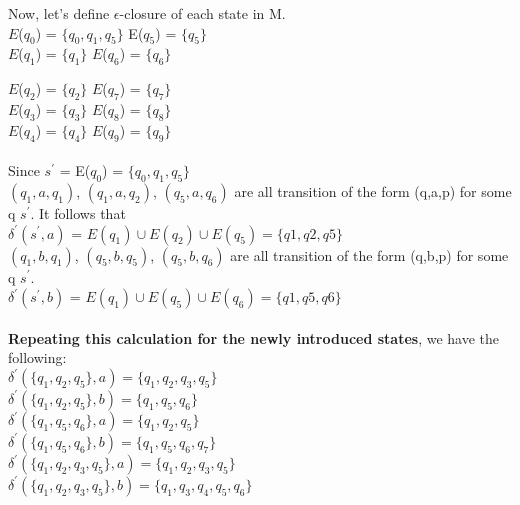 \documentclass[11pt]{article}
\begin{document}
\noindent Now, let's define $\epsilon$-closure of each state in M. \\

\noindent $E$($q_0$) = $\{q_0,q_1,q_5\}$ \indent \indent E($q_5$) = $\{q_5\}$ \\
\noindent $E$($q_1$) = $\{q_1\}$ \indent \indent \indent \space \space \space  $E$($q_6$) = $\{q_6\}$

\noindent $E$($q_2$) = $\{q_2\}$ \indent \indent \indent \space \space \space  $E$($q_7$) = $\{q_7\}$ \\
\noindent $E$($q_3$) = $\{q_3\}$ \indent \indent \indent \space \space \space  $E$($q_8$) = $\{q_8\}$ \\
\noindent $E$($q_4$) = $\{q_4\}$ \indent \indent \indent \space \space \space  $E$($q_9$) = $\{q_9\}$ \\ \\ 

\noindent Since $s^'$ = E($q_0$) = $\{q_0,q_1,q_5\}$ \\

\noindent $(q_1,a,q_1)$, $(q_1,a,q_2)$, $(q_5,a,q_6)$ are all transition of the form (q,a,p) for some q \in $ s^'$. It follows that \\

$\delta^{'}(s^{'},a)$ = $E(q_1) \cup E(q_2) \cup E(q_5) = \{q1,q2,q5\}$ \\

\noindent $(q_1,b,q_1)$, $(q_5,b,q_5)$, $(q_5,b,q_6)$ are all transition of the form (q,b,p) for some q \in $ s^'$. \\

$\delta^{'}(s^{'},b)$ = $E(q_1) \cup E(q_5) \cup E(q_6) = \{q1,q5,q6\}$ \\ \\

\noindent \textbf{Repeating this calculation for the newly introduced states}, we have the following: \\ 

$\delta^{'}(\{q_1,q_2,q_5\},a) = \{q_1,q_2,q_3,q_5\}$  \\
\indent $\delta^{'}(\{q_1,q_2,q_5\},b) = \{q_1,q_5,q_6\}$ \\ 

$\delta^{'}(\{q_1,q_5,q_6\},a) = \{q_1,q_2,q_5\}$  \\
\indent $\delta^{'}(\{q_1,q_5,q_6\},b) = \{q_1,q_5,q_6,q_7\}$  \\

$\delta^{'}(\{q_1,q_2,q_3,q_5\},a) = \{q_1,q_2,q_3,q_5\}$  \\
\indent $\delta^{'}(\{q_1,q_2,q_3,q_5\},b) = \{q_1,q_3,q_4,q_5,q_6\}$  \\
\end{document}
